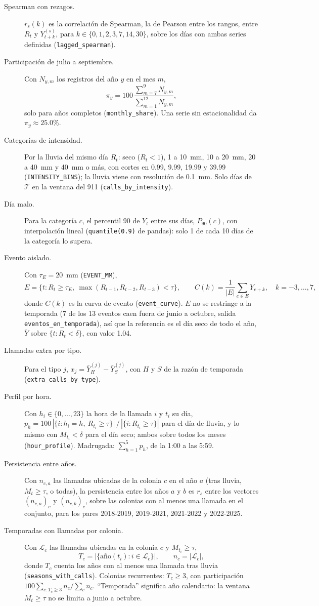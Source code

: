 \documentclass[11pt]{article}
\newcommand{\cod}[1]{\nolinkurl{#1}}
\begin{document}
\begin{description}
  \item[Spearman con rezagos.] $r_s(k)$ es la correlación de Spearman, la de Pearson entre los rangos, entre $R_t$ y $Y^{(s)}_{t+k}$, para $k\in\{0,1,2,3,7,14,30\}$, sobre los días con ambas series definidas (\cod{lagged_spearman}).
  \item[Participación de julio a septiembre.] Con $N_{y,m}$ los registros del año $y$ en el mes $m$,
  \[ \pi_y=100\,\frac{\sum_{m=7}^{9}N_{y,m}}{\sum_{m=1}^{12}N_{y,m}}, \]
  solo para años completos (\cod{monthly_share}). Una serie sin estacionalidad da $\pi_y\approx 25.0\%$.
  \item[Categorías de intensidad.] Por la lluvia del mismo día $R_t$: seco ($R_t<1$), 1 a 10~mm, 10 a 20~mm, 20 a 40~mm y 40~mm o más, con cortes en 0.99, 9.99, 19.99 y 39.99 (\cod{INTENSITY_BINS}); la lluvia viene con resolución de 0.1~mm. Solo días de $\mathcal{T}$ en la ventana del 911 (\cod{calls_by_intensity}).
  \item[Día malo.] Para la categoría $c$, el percentil 90 de $Y_t$ entre sus días, $P_{90}(c)$, con interpolación lineal (\cod{quantile(0.9)} de pandas): solo 1 de cada 10 días de la categoría lo supera.
  \item[Evento aislado.] Con $\tau_E=20$~mm (\cod{EVENT_MM}),
  \[ E=\{t:R_t\ge\tau_E,\ \max(R_{t-1},R_{t-2},R_{t-3})<\tau\}, \qquad C(k)=\frac{1}{|E|}\sum_{e\in E}Y_{e+k},\quad k=-3,\dots,7, \]
  donde $C(k)$ es la curva de evento (\cod{event_curve}). $E$ no se restringe a la temporada (7 de los 13 eventos caen fuera de junio a octubre, salida \cod{eventos_en_temporada}), así que la referencia es el día seco de todo el año, $\bar{Y}$ sobre $\{t:R_t<\delta\}$, con valor 1.04.
  \item[Llamadas extra por tipo.] Para el tipo $j$, $x_j=\bar{Y}^{(j)}_H-\bar{Y}^{(j)}_S$, con $H$ y $S$ de la razón de temporada (\cod{extra_calls_by_type}).
  \item[Perfil por hora.] Con $h_i\in\{0,\dots,23\}$ la hora de la llamada $i$ y $t_i$ su día, $p_h=100\,|\{i:h_i=h,\ R_{t_i}\ge\tau\}|\,/\,|\{i:R_{t_i}\ge\tau\}|$ para el día de lluvia, y lo mismo con $M_{t_i}<\delta$ para el día seco; ambos sobre todos los meses (\cod{hour_profile}). Madrugada: $\sum_{h=1}^{5}p_h$, de la 1:00 a las 5:59.
  \item[Persistencia entre años.] Con $n_{c,a}$ las llamadas ubicadas de la colonia $c$ en el año $a$ (tras lluvia, $M_t\ge\tau$, o todas), la persistencia entre los años $a$ y $b$ es $r_s$ entre los vectores $(n_{c,a})_c$ y $(n_{c,b})_c$, sobre las colonias con al menos una llamada en el conjunto, para los pares 2018-2019, 2019-2021, 2021-2022 y 2022-2025.
  \item[Temporadas con llamadas por colonia.] Con $\mathcal{L}_c$ las llamadas ubicadas en la colonia $c$ y $M_{t_i}\ge\tau$,
  \[ T_c=\bigl|\{\text{año}(t_i):i\in\mathcal{L}_c\}\bigr|,\qquad n_c=|\mathcal{L}_c|, \]
  donde $T_c$ cuenta los años con al menos una llamada tras lluvia (\cod{seasons_with_calls}). Colonias recurrentes: $T_c\ge 3$, con participación $100\sum_{c:T_c\ge3}n_c/\sum_c n_c$. ``Temporada'' significa año calendario: la ventana $M_t\ge\tau$ no se limita a junio a octubre.
\end{description}
\end{document}

